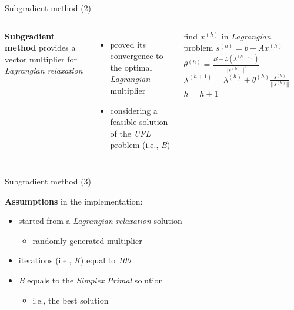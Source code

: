 \documentclass{beamer}
\begin{document}
    
    \begin{frame}{Subgradient method (2)}
        
        \begin{columns}
	      
	      
	      \textbf{Subgradient method} provides a vector multiplier for \textit{Lagrangian relaxation}
	      \begin{itemize}
	          \item proved its convergence to the optimal \textit{Lagrangian} multiplier
	          \item considering a feasible solution of the \textit{UFL} problem (i.e., \textit{B})
	      \end{itemize}
    
        
        \begin{algorithm}[H]
                \begin{algorithmic}[1]
    
                \STATE find $x^{(h)}$ in \textit{Lagrangian} problem
                \STATE $s^{(h)} = b - Ax^{(h)}$
                \ENDIF
                \STATE $\theta^{(h)} = \frac{B-L(\lambda^{(h-1)})}{||s^{(h)}||^2}$
                \STATE $\lambda^{(h+1)} = \lambda^{(h)} + \theta^{(h)}\frac{s^{(h)}}{||s^{(h)}||}$
                \STATE $h=h+1$
                \ENDIF
                
                \end{algorithmic}
                \caption{}
                \end{algorithm}
        \end{columns}
        
        \end{frame}
        
        \begin{frame}{Subgradient method (3)}
            
        \textbf{Assumptions} in the implementation:
        
        \begin{itemize}
        \item started from a \textit{Lagrangian relaxation} solution
        \begin{itemize}
            \item[\ding{113}] randomly generated multiplier 
        \end{itemize}
        \item iterations (i.e., \textit{K}) equal to \textit{100}
        \item \textit{B} equals to the  \textit{Simplex Primal} solution
        \begin{itemize}
            \item[\ding{113}] i.e., the best solution
        \end{itemize}
        \lstVI
        \end{itemize}
        \end{frame}
               
\end{document}
